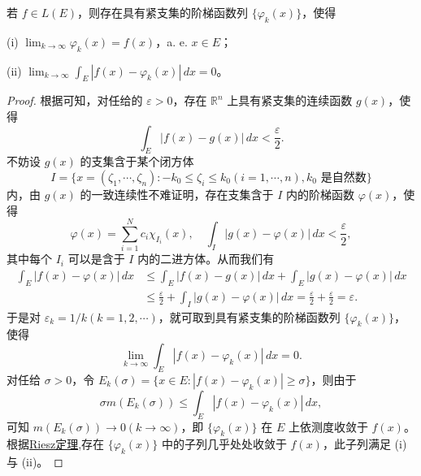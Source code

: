 \documentclass[../../main.tex]{subfiles}
\begin{document}
\begin{corollary}\label{corollary:推论4.22}
若 \( f \in L(E) \)，则存在具有紧支集的阶梯函数列 \( \{\varphi_k(x)\} \)，使得

(i) \( \lim_{k \to \infty} \varphi_k(x) = f(x) \)，a. e. \( x \in E \)；

(ii) \( \lim_{k \to \infty} \int_E |f(x) - \varphi_k(x)| \, dx = 0 \)。
\end{corollary}
\begin{proof}
根据可知，对任给的 \( \varepsilon > 0 \)，存在 \( \mathbb{R}^n \) 上具有紧支集的连续函数 \( g(x) \)，使得
\[
\int_E |f(x) - g(x)| \, dx < \frac{\varepsilon}{2}.
\]
不妨设 \( g(x) \) 的支集含于某个闭方体
\[
I = \{ x = (\zeta_1, \cdots, \zeta_n) : -k_0 \leqslant \zeta_i \leqslant k_0 (i = 1, \cdots, n), k_0 \text{ 是自然数} \}
\]
内，由 \( g(x) \) 的一致连续性不难证明，存在支集含于 \( I \) 内的阶梯函数 \( \varphi(x) \)，使得
\[
\varphi(x) = \sum_{i=1}^N c_i \chi_{I_i}(x), \quad \int_I |g(x) - \varphi(x)| \, dx < \frac{\varepsilon}{2},
\]
其中每个 \( I_i \) 可以是含于 \( I \) 内的二进方体。从而我们有
\begin{align*}
\int_E |f(x) - \varphi(x)| \, dx &\leqslant \int_E |f(x) - g(x)| \, dx + \int_E |g(x) - \varphi(x)| \, dx \\
&\leqslant \frac{\varepsilon}{2} + \int_I |g(x) - \varphi(x)| \, dx = \frac{\varepsilon}{2} + \frac{\varepsilon}{2} = \varepsilon.
\end{align*}
于是对 \( \varepsilon_k = 1/k (k = 1, 2, \cdots) \)，就可取到具有紧支集的阶梯函数列 \( \{\varphi_k(x)\} \)，使得
\[
\lim_{k \to \infty} \int_E |f(x) - \varphi_k(x)| \, dx = 0.
\]
对任给 \( \sigma > 0 \)，令 \( E_k(\sigma) = \{ x \in E : |f(x) - \varphi_k(x)| \geqslant \sigma \} \)，则由于
\[
\sigma m(E_k(\sigma)) \leqslant \int_E |f(x) - \varphi_k(x)| \, dx,
\]
可知 \( m(E_k(\sigma)) \to 0 (k \to \infty) \)，即 \( \{\varphi_k(x)\} \) 在 \( E \) 上依测度收敛于 \( f(x) \)。
根据\hyperref[theorem:Riesz定理]{Riesz定理},存在 \( \{\varphi_k(x)\} \) 中的子列几乎处处收敛于 \( f(x) \)，此子列满足 (i) 与 (ii)。
\end{proof}
\end{document}
